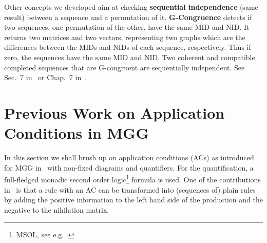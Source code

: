 \documentclass{fundam}
\begin{document}
Other concepts we developed aim at checking \textbf{sequential
  independence} (same result) between a sequence and a permutation of
it. \textbf{G-Congruence} detects if two sequences, one permutation of
the other, have the same MID and NID. It returns two matrices and two
vectors, representing two graphs which are the differences between the
MIDs and NIDs of each sequence, respectively. Thus if zero, the
sequences have the same MID and NID. Two coherent and compatible
completed sequences that are G-congruent are sequentially
independent. See Sec.~7 in~\cite{MGGCombinatorics} or Chap.~7
in~\cite{MGGBook}.

\section{Previous Work on Application Conditions in MGG}
\label{sec:previous}


In this section we shall brush up on application conditions (ACs) as
introduced for MGG in~\cite{MGGfundamenta} with non-fixed diagrams and
quantifiers. For the quantification, a full-fledged monadic second
order logic\footnote{MSOL, see e.g. \cite{Courcelle}.} formula is
used. One of the contributions in~\cite{MGGfundamenta} is that a
rule with an AC can be transformed into (sequences of) plain rules by
adding the positive information to the left hand side of the
production and the negative to the nihilation matrix.
\end{document}
